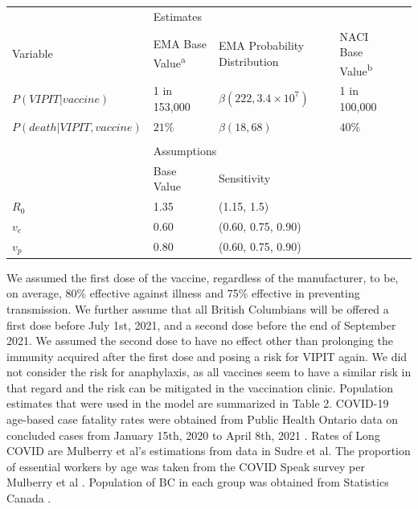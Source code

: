 \documentclass[]{interact}
\theoremstyle{plain}%
\theoremstyle{definition}
\theoremstyle{remark}
\begin{document}
\begin{table}
{\begin{tabular}{lllll} \toprule
 & \multicolumn{2}{l}{Estimates} \\ \cmidrule{2-4}
 Variable & EMA Base Value\textsuperscript{a} & EMA Probability Distribution & NACI Base Value\textsuperscript{b}  \\ \midrule
 $P(VIPIT|vaccine)$ & 1 in 153,000 & $\beta(222, 3.4\times 10^7)$ & 1 in 100,000 \\
 $P(death|VIPIT, vaccine)$ & $21\%$ &  $\beta(18, 68)$ & $40\%$ \\ \\
 & \multicolumn{2}{l}{Assumptions} \\ \cmidrule{2-4}
  & Base Value & Sensitivity & \\
 $R_0$ & 1.35 & (1.15, 1.5) &  \\ 
 $v_e$ & 0.60 & (0.60, 0.75, 0.90) &  \\ 
 $v_p$ & 0.80 & (0.60, 0.75, 0.90) &  \\ \bottomrule 

\end{tabular}}
\label{harm-param}
\end{table}

We assumed the first dose of the vaccine, regardless of the
manufacturer, to be, on average, 80\% effective against illness and 75\%
effective in preventing transmission. We further assume that all British
Columbians will be offered a first dose before July 1st, 2021, and a
second dose before the end of September 2021. We assumed the second dose
to have no effect other than prolonging the immunity acquired after the
first dose and posing a risk for VIPIT again. We did not consider the
risk for anaphylaxis, as all vaccines seem to have a similar risk in
that regard and the risk can be mitigated in the vaccination clinic.
Population estimates that were used in the model are summarized in Table
2. COVID-19 age-based case fatality rates were obtained from Public
Health Ontario data on concluded cases from January 15th, 2020 to April
8th, 2021 \citep{public_health_ontario_all_2021}. Rates of Long COVID
are Mulberry et al's estimations from data in Sudre et
al\citep{sudre_attributes_2021}. The proportion of essential workers by
age was taken from the COVID Speak survey per Mulberry et al
\citep{mulberry_vaccine_2021}. Population of BC in each group was
obtained from Statistics Canada \citep{statistics_canada_census_2017}.
\end{document}
